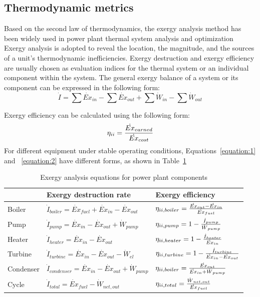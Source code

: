 \documentclass[preprint,12pt]{elsarticle}
\begin{document}
\subsection{Thermodynamic metrics} 
\label{ssub3:analsys method} 

Based on the second law of thermodynamics, the exergy analysis method has been widely used in power plant thermal system analysis and optimization~\cite{Si2017Exergy,Yang2013Comprehensive,Ahmadi2016Energy}
Exergy analysis is adopted to reveal the location, the magnitude, and the sources of a unit's thermodynamic inefficiencies.
Exergy destruction and exergy efficiency are usually chosen as evaluation indices for the thermal system or an individual component within the system. 
The general exergy balance of a system or its component can be expressed in the following form:
\begin{equation}
\label{equation:1}
\dot{I}=\sum\dot{Ex}{}_{in}-\sum\dot{Ex}{}_{out}+\sum\dot{W}{}_{in}-\sum\dot{W}{}_{out}
\end{equation}





Exergy efficiency can be calculated using the following form:
\begin{equation}
\label{equation:2}
\eta_{\uppercase\expandafter{\romannumeral2}}=\frac{\dot{Ex}{}_{earned}}{\dot{Ex}{}_{cost}}
\end{equation}
For different equipment under stable operating conditions, Equations~\ref{equation:1} and ~\ref{equation:2} have different forms, as shown in Table~\ref{tab:exergy equation}~\cite{Aljundi2009Energy}

\begin{table}
\caption{Exergy analysis equations for power plant components}
\label{tab:exergy equation}
\centering
\begin{tabular}{lll}
\toprule 
 & Exergy destruction rate & Exergy efficiency\tabularnewline
\midrule
Boiler & $\dot{I}_{boiler}=\dot{Ex}{}_{fuel}+\dot{Ex}{}_{in}-\dot{Ex}{}_{out}$ & $\eta_{\uppercase\expandafter{\romannumeral2},boiler}=\frac{\dot{Ex}{}_{out}-\dot{Ex}{}_{in}}{\dot{Ex}{}_{fuel}}$\tabularnewline
Pump & $\dot{I}_{pump}=\dot{Ex}{}_{in}-\dot{Ex}{}_{out}+\dot{W}{}_{pump}$ & $\eta_{\uppercase\expandafter{\romannumeral2},pump}=1-\frac{\dot{I}_{pump}}{\dot{W}{}_{pump}}$\tabularnewline
Heater & $\dot{I}_{heater}=\dot{Ex}{}_{in}-\dot{Ex}{}_{out}$ & $\eta_{\uppercase\expandafter{\romannumeral2},heater}=1-\frac{\dot{I}_{heater}}{\dot{Ex}{}_{in}}$\tabularnewline
Turbine & $\dot{I}_{turbine}=\dot{Ex}{}_{in}-\dot{Ex}{}_{out}-\dot{W}{}_{el}$ & $\eta_{\uppercase\expandafter{\romannumeral2},turbine}=1-\frac{\dot{I}_{turbine}}{\dot{Ex}{}_{in}-\dot{Ex}{}_{out}}$\tabularnewline
Condenser & $\dot{I}_{condenser}=\dot{Ex}{}_{in}-\dot{Ex}{}_{out}+\dot{W}{}_{pump}$ & $\eta_{\uppercase\expandafter{\romannumeral2},boiler}=\frac{\dot{Ex}{}_{out}}{\dot{Ex}{}_{in}+\dot{W}{}_{pump}}$\tabularnewline
Cycle &$\dot{I}_{total}=\dot{Ex}{}_{fuel}-\dot{W}{}_{net,out}$ & $\eta_{\uppercase\expandafter{\romannumeral2},total}=\frac{\dot{W}{}_{net,out}}{\dot{Ex}{}_{fuel}}$\tabularnewline
\bottomrule
\end{tabular}
\end{table}
\end{document}
